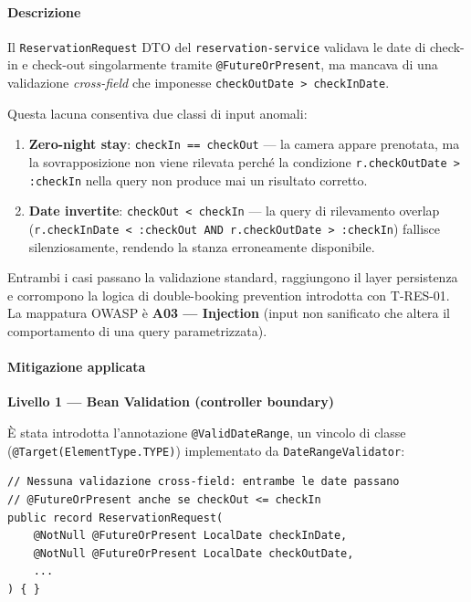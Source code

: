 ﻿\documentclass[a4paper,12pt]{report}
\begin{document}
\paragraph{Descrizione}
Il \texttt{ReservationRequest} DTO del \texttt{reservation-service} validava le date
di check-in e check-out singolarmente tramite \texttt{@FutureOrPresent}, ma mancava
di una validazione \emph{cross-field} che imponesse \texttt{checkOutDate > checkInDate}.

Questa lacuna consentiva due classi di input anomali:

\begin{enumerate}
  \item \textbf{Zero-night stay}: \texttt{checkIn == checkOut} --- la camera appare
        prenotata, ma la sovrapposizione non viene rilevata perché la condizione
        \texttt{r.checkOutDate > :checkIn} nella query non produce mai un risultato
        corretto.
  \item \textbf{Date invertite}: \texttt{checkOut < checkIn} --- la query di rilevamento overlap \\
        (\texttt{r.checkInDate < :checkOut AND r.checkOutDate > :checkIn})
        fallisce silenziosamente, rendendo la stanza erroneamente disponibile.
\end{enumerate}

Entrambi i casi passano la validazione standard, raggiungono il layer persistenza e
corrompono la logica di double-booking prevention introdotta con T-RES-01.
La mappatura OWASP è \textbf{A03 --- Injection} (input non sanificato che altera il
comportamento di una query parametrizzata).

\paragraph{Mitigazione applicata}

\textbf{Livello 1 --- Bean Validation (controller boundary)}

È stata introdotta l'annotazione \texttt{@ValidDateRange}, un vincolo di classe \\
(\texttt{@Target(ElementType.TYPE)}) implementato da \texttt{DateRangeValidator}:

\begin{insecurebox}[title={Codice Vulnerabile --- ReservationRequest.java (prima)}]
\begin{lstlisting}[style=java]
// Nessuna validazione cross-field: entrambe le date passano
// @FutureOrPresent anche se checkOut <= checkIn
public record ReservationRequest(
    @NotNull @FutureOrPresent LocalDate checkInDate,
    @NotNull @FutureOrPresent LocalDate checkOutDate,
    ...
) { }
\end{lstlisting}
\end{insecurebox}
\end{document}
